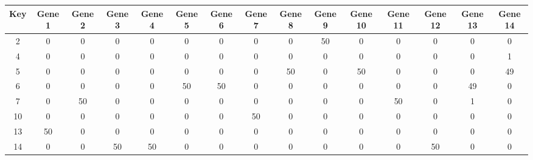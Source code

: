 \begin{tabular}{|c|c|c|c|c|c|c|c|c|c|c|c|c|c|c|}
\hline
Key & Gene 1 & Gene 2 & Gene 3 & Gene 4 & Gene 5 & Gene 6 & Gene 7 & Gene 8 & Gene 9 & Gene 10 & Gene 11 & Gene 12 & Gene 13 & Gene 14 \\
\hline
2 & 0 & 0 & 0 & 0 & 0 & 0 & 0 & 0 & 50 & 0 & 0 & 0 & 0 & 0 \\
4 & 0 & 0 & 0 & 0 & 0 & 0 & 0 & 0 & 0 & 0 & 0 & 0 & 0 & 1 \\
5 & 0 & 0 & 0 & 0 & 0 & 0 & 0 & 50 & 0 & 50 & 0 & 0 & 0 & 49 \\
6 & 0 & 0 & 0 & 0 & 50 & 50 & 0 & 0 & 0 & 0 & 0 & 0 & 49 & 0 \\
7 & 0 & 50 & 0 & 0 & 0 & 0 & 0 & 0 & 0 & 0 & 50 & 0 & 1 & 0 \\
10 & 0 & 0 & 0 & 0 & 0 & 0 & 50 & 0 & 0 & 0 & 0 & 0 & 0 & 0 \\
13 & 50 & 0 & 0 & 0 & 0 & 0 & 0 & 0 & 0 & 0 & 0 & 0 & 0 & 0 \\
14 & 0 & 0 & 50 & 50 & 0 & 0 & 0 & 0 & 0 & 0 & 0 & 50 & 0 & 0 \\
\hline
\end{tabular}